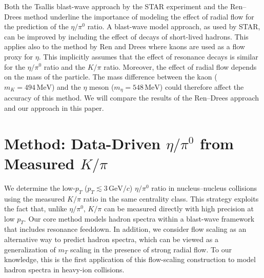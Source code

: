 \documentclass[%
 reprint,
 amsmath,amssymb,
 aps,
prc,
]{revtex4-2}
\begin{document}
Both the Tsallis blast-wave approach by the STAR experiment and the Ren--Drees method underline the importance of modeling the effect of radial flow for the prediction of the $\eta/\pi^0$ ratio. A blast-wave model approach, as used by STAR, can be improved by including the effect of decays of short-lived hadrons. This applies also to the method by Ren and Drees where kaons are used as a flow proxy for $\eta$. This implicitly assumes that the effect of resonance decays is similar for the $\eta/\pi^0$ ratio and the $K/\pi$ ratio. Moreover, the effect of radial flow depends on the mass of the particle. The mass difference between the kaon ($m_K = 494\,\mathrm{MeV}$) and the $\eta$ meson ($m_\eta = 548\,\mathrm{MeV}$) could therefore affect the accuracy of this method. We will compare the results of the Ren--Drees approach and our approach in this paper.

\section{\boldmath Method: Data-Driven $\eta/\pi^{0}$ from Measured $K/\pi$}

We determine the low-$p_T$ ($p_T \lesssim 3\,\mathrm{GeV}/c$) $\eta/\pi^0$ ratio in nucleus--nucleus collisions using the measured $K/\pi$ ratio in the same centrality class. This strategy exploits the fact that, unlike $\eta/\pi^0$, $K/\pi$ can be measured directly with high precision at low $p_T$. Our core method models hadron spectra within a blast-wave framework that includes resonance feeddown. In addition, we consider flow scaling as an alternative way to predict hadron spectra, which can be viewed as a generalization of $m_T$ scaling in the presence of strong radial flow. To our knowledge, this is the first application of this flow-scaling construction to model hadron spectra in heavy-ion collisions.
\end{document}
